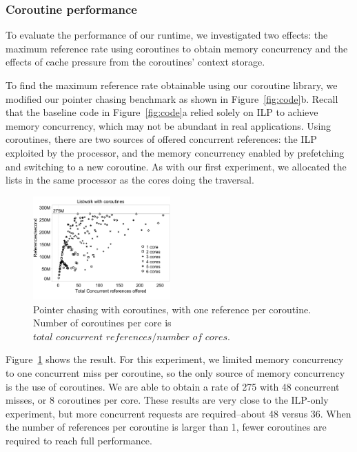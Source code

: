 \documentclass[10pt,nocopyrightspace,preprint]{sigplanconf}
\begin{document}
\subsubsection{Coroutine performance}

To evaluate the performance of our runtime, we investigated two
effects: the maximum reference rate using coroutines
to obtain memory concurrency and the effects of cache pressure from the
coroutines' context storage. 

To find the maximum reference rate obtainable using our coroutine
library, we modified our pointer chasing benchmark as shown in
Figure~\ref{fig:code}b. Recall that the baseline code in Figure~\ref{fig:code}a relied solely on ILP to achieve memory concurrency, which may not be abundant in real applications. Using coroutines, there are two sources of offered
concurrent references: the ILP exploited by the processor, and the
memory concurrency enabled by prefetching and switching to a new
coroutine. As with our first experiment, we allocated the lists in the
same processor as the cores doing the traversal. 

\begin{figure}[h]
  \begin{center}
    \includegraphics[width=0.47\textwidth]{figures/multi-green-edited.pdf}
  \end{center}
  \caption{Pointer chasing with coroutines, with one reference per
    coroutine. Number of coroutines per core is $\textit{total concurrent references} / \textit{number of cores}$.}
  \label{fig:multi-green}
\end{figure}

Figure~\ref{fig:multi-green} shows the result. For this
experiment, we limited memory concurrency to one concurrent miss per
coroutine, so the only source of memory concurrency is the use of
coroutines. We are able to obtain a rate of 275 \mrps with 48 concurrent misses, or 8 coroutines per core. These
results are very close to the ILP-only experiment, but more concurrent requests are required--about 48 versus 36. When the number of references per coroutine is larger than 1, fewer coroutines are required to reach full performance.
\end{document}
